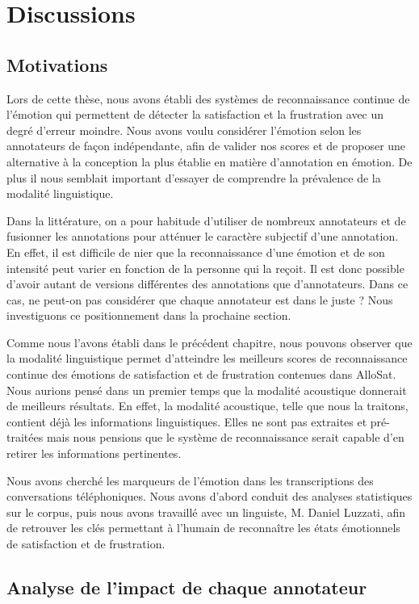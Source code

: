 \chapter{Discussions}

\section{Motivations}
Lors de cette thèse, nous avons établi des systèmes de reconnaissance continue de l'émotion qui permettent de détecter la satisfaction et la frustration avec un degré d'erreur moindre. Nous avons voulu considérer l'émotion selon les annotateurs de façon indépendante, afin de valider nos scores et de proposer une alternative à la conception la plus établie en matière d'annotation en émotion. De plus il nous semblait important d'essayer de comprendre la prévalence de la modalité linguistique.

Dans la littérature, on a pour habitude d'utiliser de nombreux annotateurs et de fusionner les annotations pour atténuer le caractère subjectif d'une annotation. En effet, il est difficile de nier que la reconnaissance d'une émotion et de son intensité peut varier en fonction de la personne qui la reçoit. Il est donc possible d'avoir autant de versions différentes des annotations que d'annotateurs. Dans ce cas, ne peut-on pas considérer que chaque annotateur est dans le juste ? Nous investiguons ce positionnement dans la prochaine section.

Comme nous l'avons établi dans le précédent chapitre, nous pouvons observer que la modalité linguistique permet d'atteindre les meilleurs scores de reconnaissance continue des émotions de satisfaction et de frustration contenues dans AlloSat. Nous aurions pensé dans un premier temps que la modalité acoustique donnerait de meilleurs résultats. En effet, la modalité acoustique, telle que nous la traitons, contient déjà les informations linguistiques. Elles ne sont pas extraites et pré-traitées mais nous pensions que le système de reconnaissance serait capable d'en retirer les informations pertinentes.

Nous avons cherché les marqueurs de l'émotion dans les transcriptions des conversations téléphoniques. Nous avons d'abord conduit des analyses statistiques sur le corpus, puis nous avons travaillé avec un linguiste, M. Daniel Luzzati, afin de retrouver les clés permettant à l'humain de reconnaître les états émotionnels de satisfaction et de frustration.

\section{Analyse de l'impact de chaque annotateur}

